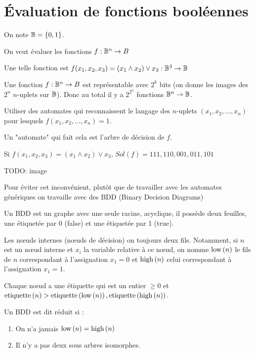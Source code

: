 \section{Évaluation de fonctions booléennes}

\begin{notation}
	On note $\mathbb{B} = \left\{0,1\right\}$.
\end{notation}

On veut évaluer les fonctions $f : \mathbb{B} ^ n \to B$

\begin{exemple}
	Une telle fonction est $f(x_1,x_2,x_3) = (x_1 \land x_2) \lor x_3 : \mathbb{B}^3 \to \mathbb{B}$
\end{exemple}

Une fonction $f : \mathbb{B} ^ n \to B$ est représentable avec $2^k$ bits
(on donne les images des $2^n$ $n$-uplets sur $\mathbb{B}$).
Donc au total il y a $2^{2^n}$ fonctions $\mathbb{B}^n \to \mathbb{B}$.

\begin{idee}
	Utiliser des automates qui reconnaissent le langage des $n$-uplets
	$(x_1,x_2,\ldots, x_n)$ pour lesquels $f(x_1, x_2, \ldots, x_n) = 1$.
\end{idee}

Un "automate" qui fait cela est l'arbre de décision de $f$.

\begin{exemple}
	Si $f(x_1,x_2,x_3) = (x_1 \land x_2) \lor x_3$, $Sol(f) = 111,110,001,011,101$

	TODO: image
\end{exemple}


Pour éviter cet inconvénient, plutôt que de travailler avec les automates génériques
on travaille avec des BDD (Binary Decision Diagrams)

\begin{definition}
	Un BDD est un graphe avec une seule racine, acyclique, il possède deux feuilles,
	une étiquetée par 0 (false) et une étiquetée par 1 (true).

	Les nœuds internes (nœuds de décision) on toujours deux fils. Notamment, si $n$ est un nœud interne
	et $x_i$ la variable relative à ce nœud, on nomme $\text{low}\left(n\right)$ le fils de $n$ correspondant à l'assignation
	$x_1 = 0$ et $\text{high}\left(n\right)$ celui correspondant à l'assignation $x_1 = 1$.

	Chaque nœud a une étiquette qui est un entier $\geq 0$ et $\text{etiquette}\left(n\right) > \text{etiquette}\left(\text{low}\left(n\right)\right),  \text{etiquette}\left(\text{high}\left(n\right)\right)$.
\end{definition}


\begin{definition}
	Un BDD est dit réduit si :
	\begin{enumerate}
		\item On n'a jamais $\text{low}\left(n\right) = \text{high}\left(n\right)$
		\item Il n'y a pas deux sous arbres isomorphes.
	\end{enumerate}
\end{definition}

